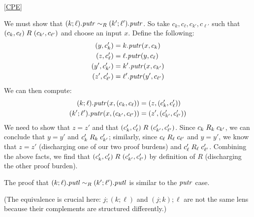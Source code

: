 \begin{defn}[$R$-similarity]
\begin{theorem}
\begin{pfof}{\ref{CPE}}
\begin{longenum}
      \item We must show that $(k;\ell).\mathit{putr}\sim_R(k';\ell').\mathit{putr}$. So
          take $c_k,c_\ell,c_{k'},c_{\ell'}$ such that
          $(c_k,c_\ell)\mathrel{R_{}}(c_{k'},c_{\ell'})$ and choose an input $x$.
          Define the following:
          \begin{align*}
              (y,c_k') &= k.\mathit{putr}(x,c_k) \\
              (z,c_\ell') &= \ell.\mathit{putr}(y,c_\ell) \\
              (y',c_{k'}') &= k'.\mathit{putr}(x,c_{k'}) \\
              (z',c_{\ell'}') &= \ell'.\mathit{putr}(y',c_{\ell'})
          \end{align*}
          We can then compute:
          \begin{align*}
              (k;\ell).\mathit{putr}(x,(c_k,c_\ell)) &= (z,(c_k',c_\ell')) \\
              (k';\ell').\mathit{putr}(x,(c_{k'},c_{\ell'})) &= (z',(c_{k'}',c_{\ell'}'))
          \end{align*}
          We need to show that $z = z'$ and that
          $(c_k',c_\ell')\mathrel{R_{}}(c_{k'}',c_{\ell'}')$.  Since
          $c_k \mathrel{R_{k}} c_{k'}$, we can conclude that $y = y'$ and
          $c_k' \mathrel{R_{k}} c_{k'}'$; similarly, since
          $c_\ell \mathrel{R_{\ell}} c_{\ell'}$ and $y = y'$, we know that $z =
          z'$ (discharging one of our two proof burdens) and
          $c_\ell' \mathrel{R_{\ell}} c_{\ell'}'$. Combining the above facts, we
          find that $(c_k',c_\ell')\mathrel{R_{}}(c_{k'}',c_{\ell'}')$ by definition
          of $R$ (discharging the other proof burden).

      \item The proof that $(k;\ell).\mathit{putl}\sim_R(k';\ell').\mathit{putl}$ is
          similar to the $\mathit{putr}$ case.\endofpf
  \end{longenum}
\end{pfof}

\begin{lemma}
%
(The equivalence is crucial here: $j;(k;\ell)$ and $(j;k);\ell$ are not
the same lens because their complements are structured differently.)
\end{lemma}



\end{theorem}
\end{defn}
